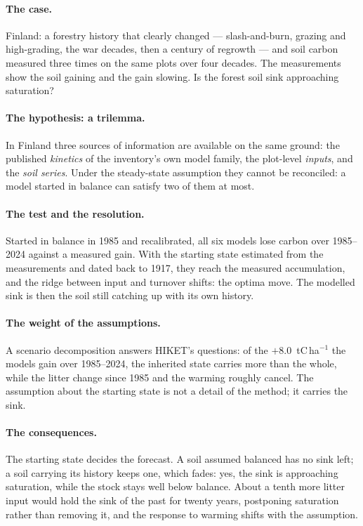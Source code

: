 \documentclass[11pt]{article}
\begin{document}
\paragraph{The case.} Finland: a forestry history that clearly changed --- slash-and-burn, grazing and
high-grading, the war decades, then a century of regrowth --- and soil carbon measured three times on the
same plots over four decades. The measurements show the soil gaining and the gain slowing. Is the forest
soil sink approaching saturation?

\paragraph{The hypothesis: a trilemma.} In Finland three sources of information are available on the same
ground: the published \emph{kinetics} of the inventory's own model family, the plot-level \emph{inputs}, and
the \emph{soil series}. Under the steady-state assumption they cannot be reconciled: a model started in
balance can satisfy two of them at most.

\paragraph{The test and the resolution.} Started in balance in 1985 and recalibrated, all six models lose
carbon over 1985--2024 against a measured gain. With the starting state estimated from the measurements and
dated back to 1917, they reach the measured accumulation, and the ridge between input and turnover shifts:
the optima move. The modelled sink is then the soil still catching up with its own history.

\paragraph{The weight of the assumptions.} A scenario decomposition answers HIKET's questions: of the
$+8.0$~tC\,ha$^{-1}$ the models gain over 1985--2024, the inherited state carries more than the whole, while the
litter change since 1985 and the warming roughly cancel. The assumption about the starting state is not a
detail of the method; it carries the sink.

\paragraph{The consequences.} The starting state decides the forecast. A soil assumed balanced has no sink
left; a soil carrying its history keeps one, which fades: yes, the sink is approaching saturation, while the
stock stays well below balance. About a tenth more litter input would hold the sink of the past for twenty
years, postponing saturation rather than removing it, and the response to warming shifts with the
assumption.
\end{document}
